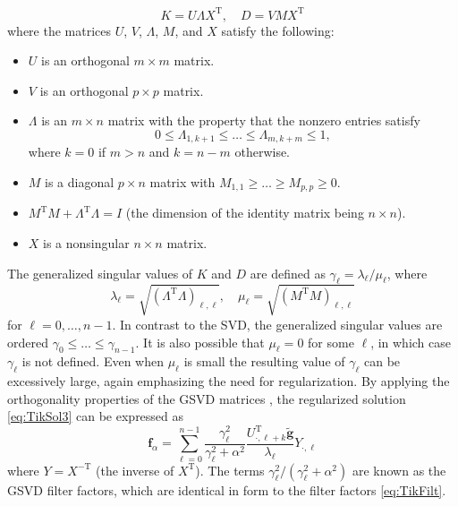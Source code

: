\documentclass[12pt,notitlepage]{report}
\newcommand{\gnoiseVec}{\widetilde{\mathbf{g}}}	%
\newcommand{\kMat}{K}	%
\newcommand{\fVec}{\mathbf{f}}	%
\newcommand{\trans}{\mathrm{T}}	%
\newcommand{\regparam}{\alpha}
\begin{document}
\begin{equation}
\label{eq:GSVD matrices}
\kMat = U\Lambda X^\trans, \quad D = VMX^\trans
\end{equation}
where the matrices $U$, $V$, $\Lambda$, $M$, and $X$ satisfy the following: 
\begin{itemize}
\item $U$ is an orthogonal $m \times m$ matrix. 
\item $V$ is an orthogonal $p \times p$ matrix.
\item $\Lambda$ is an $m \times n$ matrix with the property that the nonzero entries satisfy
\[0 \leq \Lambda_{1,k+1} \leq \ldots \leq \Lambda_{m,k+m} \leq 1,\]
where $k = 0$ if $m > n$ and $k = n-m$ otherwise. 
\item $M$ is a diagonal $p \times n$ matrix with $M_{1,1} \geq \ldots \geq M_{p,p} \geq 0.$
\item $M^\trans M + \Lambda^\trans \Lambda = I$ (the dimension of the identity matrix being $n \times n$).
\item $X$ is a nonsingular $n \times n$ matrix.
\end{itemize}
The generalized singular values of $\kMat$ and $D$ are defined as $\gamma_\ell = \lambda_{\ell}/\mu_{\ell}$, where
\begin{equation}
\label{eq:GSVD lambda}
\lambda_\ell = \sqrt{(\Lambda^\trans \Lambda)_{\ell,\ell}}, \quad \mu_\ell = \sqrt{(M^\trans M)_{\ell,\ell}}
\end{equation}
for $\ell = 0,\ldots,{n-1}$. In contrast to the SVD, the generalized singular values are ordered $\gamma_0 \leq \ldots \leq \gamma_{n-1}$. It is also possible that $\mu_\ell = 0$ for some $\ell$, in which case $\gamma_\ell$ is not defined. Even when $\mu_\ell$ is small the resulting value of $\gamma_\ell$ can be excessively large, again emphasizing the need for regularization. By applying the orthogonality properties of the GSVD matrices \cite[p.~105-106]{ABT}, the regularized solution \eqref{eq:TikSol3} can be expressed as
\begin{equation}
\label{eq:TikSol GSVD}
\fVec_\regparam = \sum_{\ell=0}^{n-1} \frac{\gamma_\ell^2}{\gamma_\ell^2 + \regparam^2} \frac{U_{\cdot,\ell+k}^\trans\gnoiseVec}{\lambda_\ell}Y_{\cdot,\ell}
\end{equation}
where $Y = X^{-\trans}$ (the inverse of $X^\trans$). The terms $\gamma_\ell^2/(\gamma_\ell^2 + \regparam^2)$ are known as the GSVD filter factors, which are identical in form to the filter factors \eqref{eq:TikFilt}. \par 
\end{document}
